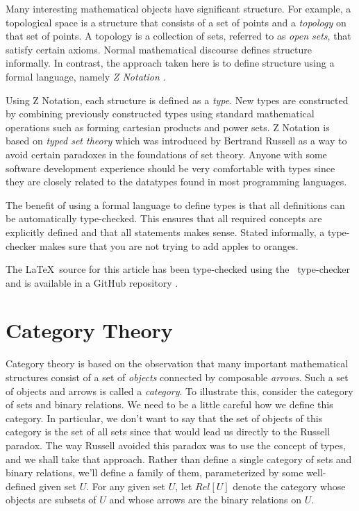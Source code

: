\documentclass{article}
\begin{document}
Many interesting mathematical objects have significant structure. 
For example, a topological space is a structure that consists of a set of points and a {\it topology} on that set of points.
A topology is a collection of sets, referred to as {\it open sets}, that satisfy certain axioms.
Normal mathematical discourse defines structure informally.
In contrast, the approach taken here is to define structure using a formal language, namely {\it Z Notation} \cite{spivey:zrm}.

Using Z Notation, each structure is defined as a {\it type}.
New types are constructed by combining previously constructed types using standard mathematical operations such as forming cartesian products and power sets.
Z Notation is based on {\it typed set theory} which was introduced by Bertrand Russell as a way to avoid certain paradoxes in the foundations
of set theory.
Anyone with some software development experience should be very comfortable with types since they are closely related to the datatypes
found in most programming languages.

The benefit of using a formal language to define types is that all definitions can be automatically type-checked.
This ensures that all required concepts are explicitly defined and that all statements makes sense.
Stated informally, a type-checker makes sure that you are not trying to add apples to oranges.

The \LaTeX\ source for this article has been type-checked using the \fuzz\ type-checker \cite{spivey:fuzz}
and is available in a GitHub repository \cite{agryman:probability-and-statistics}.

\section{Category Theory}

Category theory is based on the observation that many important mathematical structures consist of a set of {\it objects} connected by composable {\it arrows}.
Such a set of objects and arrows is called a {\it category}.
To illustrate this, consider the category of sets and binary relations.
We need to be a little careful how we define this category.
In particular, we don't want to say that the set of objects of this category is the set of all sets since that would lead us directly to the Russell paradox.
The way Russell avoided this paradox was to use the concept of types, and we shall take that approach.
Rather than define a single category of sets and binary relations, we'll define a family of them, parameterized by 
some well-defined given set $U$.
For any given set $U$, let $Rel[U]$ denote the category whose objects are subsets of $U$ and whose arrows are the binary relations
on $U$.
\end{document}
